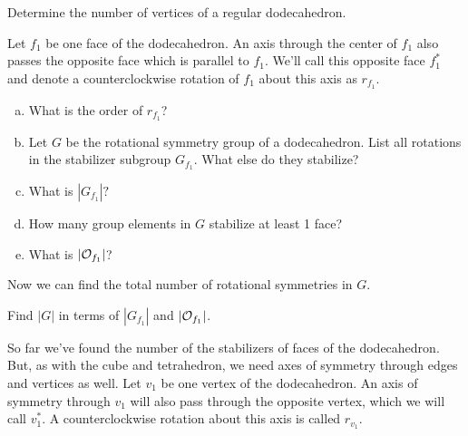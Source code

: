 \begin{exercise}\label{exercise:actions:Dodeca1}
Determine the number of vertices of a regular dodecahedron.
\end{exercise}
Let $f_1$ be one face of the dodecahedron.  An axis through the center of $f_1$ also passes the opposite face which is parallel to $f_1$. We'll call this opposite face $f_1^*$ and denote a counterclockwise rotation of $f_1$ about this axis as $r_{f_1}$.

\begin{exercise}\label{exercise:actions:Dodeca2}
\begin{enumerate}[(a)]
\item What is the order of $r_{f_1}$?
\item Let $G$ be the rotational symmetry group of a dodecahedron.  List all rotations in the stabilizer subgroup $G_{f_1}$.  What else do they stabilize?
\item What is $|G_{f_1}|?$
\item How many group elements in $G$ stabilize at least 1 face?
\item What is $|{\cal O}_{f_1}|$?
\end{enumerate}
\end{exercise}
Now we can find the total number of rotational symmetries in $G$.

\begin{exercise}\label{exercise:actions:Dodeca3}
Find $|G|$ in terms of $|G_{f_1}|$ and $|{\cal O}_{f_1}|$.
\end{exercise}
So far we've found the number of the stabilizers of faces of the dodecahedron.  But, as with the cube and tetrahedron, we need axes of symmetry through edges and vertices as well.
Let $v_1$ be one vertex of the dodecahedron.  An axis of symmetry through $v_1$ will also pass through the opposite vertex, which we will call $v_1^*$.  A counterclockwise rotation about this axis is called $r_{v_1}$.

